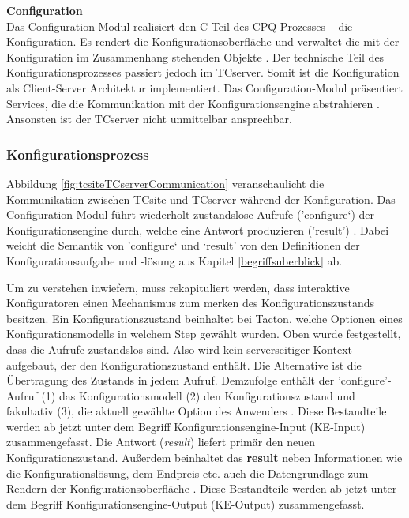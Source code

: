 \documentclass[11pt, a4paper, titlepage, listof=totoc, bibliography=totoc, index=totoc, twoside, openright, headings=normal]{scrreprt}
\begin{document}
\textbf{Configuration}\\
Das Configuration-Modul realisiert den C-Teil des CPQ-Prozesses -- die Konfiguration. Es rendert die Konfigurationsoberfläche und verwaltet die mit der Konfiguration im Zusammenhang stehenden Objekte \citep{tactonTCsiteDevelopmentManual}. Der technische Teil des Konfigurationsprozesses passiert jedoch im TCserver. Somit ist die Konfiguration als Client-Server Architektur implementiert. Das Configuration-Modul präsentiert Services, die die Kommunikation mit der Konfigurationsengine abstrahieren \citep{tactonTCsiteApiDocu}. Ansonsten ist der TCserver nicht unmittelbar ansprechbar.

\subsubsection{Konfigurationsprozess}
\label{subsubsection:tcsiteKonfigurationsprozess}

Abbildung \ref{fig:tcsiteTCserverCommunication} veranschaulicht die Kommunikation zwischen TCsite und TCserver während der Konfiguration. Das Configuration-Modul führt wiederholt zustandslose Aufrufe ('configure‘) der Konfigurationsengine durch, welche eine Antwort produzieren ('result') \citep{tactonTCsiteDevelopmentManual}. Dabei weicht die Semantik von 'configure‘ und ‘result' von den Definitionen der Konfigurationsaufgabe und -lösung aus Kapitel \ref{begriffsuberblick} ab.

Um zu verstehen inwiefern, muss rekapituliert werden, dass interaktive Konfiguratoren einen Mechanismus zum merken des Konfigurationszustands besitzen. Ein Konfigurationszustand beinhaltet bei Tacton, welche Optionen eines Konfigurationsmodells in welchem Step gewählt wurden. Oben wurde festgestellt, dass die Aufrufe zustandslos sind. Also wird kein serverseitiger Kontext aufgebaut, der den Konfigurationszustand enthält. Die Alternative ist die Übertragung des Zustands in jedem Aufruf. Demzufolge enthält der 'configure'-Aufruf (1) das Konfigurationsmodell (2) den Konfigurationszustand und fakultativ (3), die aktuell gewählte Option des Anwenders \citep{tactonTCsiteApiDocu}. Diese Bestandteile werden ab jetzt unter dem Begriff Konfigurationsengine-Input (KE-Input) zusammengefasst. Die Antwort (\emph{result}) liefert primär den neuen Konfigurationszustand. Außerdem beinhaltet das \textbf{result} neben Informationen wie die Konfigurationslösung, dem Endpreis etc. auch die Datengrundlage zum Rendern der Konfigurationsoberfläche \citep{tactonTCsiteApiDocu}. Diese Bestandteile werden ab jetzt unter dem Begriff Konfigurationsengine-Output (KE-Output) zusammengefasst.
\end{document}
